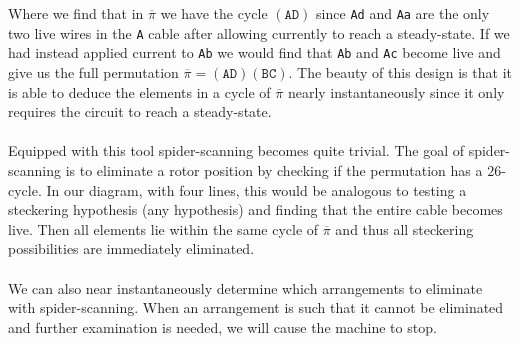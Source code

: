 \begin{center}
\end{center}
Where we find that in $\overline\pi$ we have the cycle $(\texttt{AD})$
since \texttt{Ad} and \texttt{Aa} are the only two live
wires in the \texttt{A} cable after allowing currently to reach a
steady-state. If we had instead applied current to \texttt{Ab} we would find
that \texttt{Ab} and \texttt{Ac} become live and give us the full
permutation $\overline\pi = (\texttt{AD})(\texttt{BC})$. The beauty of this design
is that it is able to deduce the elements in a cycle of
$\overline\pi$ nearly instantaneously since it only requires the
circuit to reach
a steady-state.
\\\\Equipped with this tool spider-scanning becomes quite trivial.
The goal of spider-scanning is to eliminate a rotor position by
checking if the permutation has a $26$-cycle. In our diagram, with four lines,
this would be analogous to testing a steckering hypothesis (any
hypothesis) and finding that the entire cable becomes live. Then all
elements lie within the same cycle of $\overline\pi$ and thus all
steckering possibilities are immediately eliminated.
\\\\We can also near instantaneously determine which arrangements to
eliminate with spider-scanning. When an arrangement is such that it
cannot be eliminated and further examination is needed, we will cause
the machine to stop.
